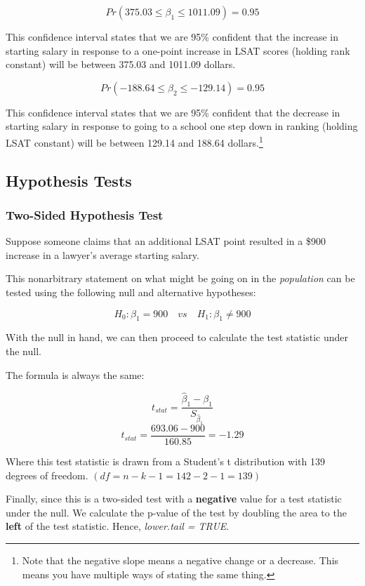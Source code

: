 \documentclass[
]{book}
\begin{document}
\[Pr(375.03 \leq \beta_1 \leq 1011.09)=0.95\]

This confidence interval states that we are 95\% confident that the increase in starting salary in response to a one-point increase in LSAT scores (holding rank constant) will be between 375.03 and 1011.09 dollars.

\medskip

\[Pr(-188.64 \leq \beta_2 \leq -129.14)=0.95\]

This confidence interval states that we are 95\% confident that the decrease in starting salary in response to going to a school one step down in ranking (holding LSAT constant) will be between 129.14 and 188.64 dollars.\footnote{Note that the negative slope means a negative change or a decrease. This means you have multiple ways of stating the same thing.}

\subsection*{Hypothesis Tests}\label{hypothesis-tests-2}

\subsubsection*{Two-Sided Hypothesis Test}\label{two-sided-hypothesis-test}

Suppose someone claims that an additional LSAT point resulted in a \$900 increase in a lawyer's average starting salary.

This nonarbitrary statement on what might be going on in the \emph{population} can be tested using the following null and alternative hypotheses:

\[H_0: \beta_1 = 900 \quad vs \quad H_1: \beta_1 \neq 900\]

With the null in hand, we can then proceed to calculate the test statistic under the null.

The formula is always the same:

\[t_{stat} = \frac{\hat{\beta}_1 - \beta_1}{S_{\hat{\beta}_1}}\]
\[t_{stat} = \frac{693.06 - 900}{160.85}= -1.29\]

Where this test statistic is drawn from a Student's t distribution with 139 degrees of freedom. \((df = n-k-1 = 142-2-1 = 139)\)

Finally, since this is a two-sided test with a \textbf{negative} value for a test statistic under the null. We calculate the p-value of the test by doubling the area to the \textbf{left} of the test statistic. Hence, \emph{lower.tail = TRUE}.
\end{document}
